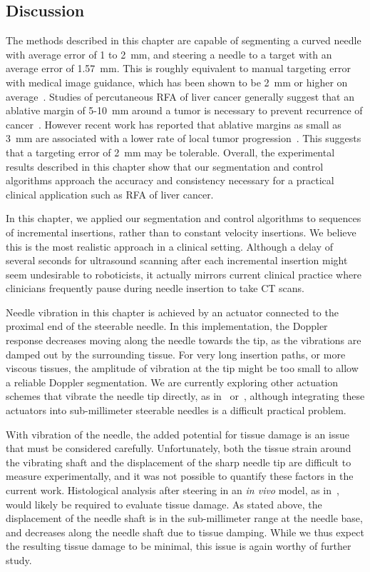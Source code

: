 \subsection{Discussion}
The methods described in this chapter are capable of segmenting a curved needle with average error of 1 to 2~mm, and steering a needle to a target with an average error of 1.57~mm. This is roughly equivalent to manual targeting error with medical image guidance, which has been shown to be 2~mm or higher on average~\cite{Crocetti2008,MaierHein2008,Schubert2013}. Studies of percutaneous RFA of liver cancer generally suggest that an ablative margin of 5-10~mm around a tumor is necessary to prevent recurrence of cancer~\cite{Gervais2009,Kim2006,Dodd2001}. However recent work has reported that ablative margins as small as 3~mm are associated with a lower rate of local tumor progression~\cite{Kim2010}. This suggests that a targeting error of 2~mm may be tolerable. Overall, the experimental results described in this chapter show that our segmentation and control algorithms approach the accuracy and consistency necessary for a practical clinical application such as RFA of liver cancer. 

In this chapter, we applied our segmentation and control algorithms to sequences of incremental insertions, rather than to constant velocity insertions. We believe this is the most realistic approach in a clinical setting. Although a delay of several seconds for ultrasound scanning after each incremental insertion might seem undesirable to roboticists, it actually mirrors current clinical practice where clinicians frequently pause during needle insertion to take CT scans. 

Needle vibration in this chapter is achieved by an actuator connected to the proximal end of the steerable needle. In this implementation, the Doppler response decreases moving along the needle towards the tip, as the vibrations are damped out by the surrounding tissue. For very long insertion paths, or more viscous tissues, the amplitude of vibration at the tip might be too small to allow a reliable Doppler segmentation. We are currently exploring other actuation schemes that vibrate the needle tip directly, as in~\cite{Harmat2006} or~\cite{McAleavey2003}, although integrating these actuators into sub-millimeter steerable needles is a difficult practical problem.

With vibration of the needle, the added potential for tissue damage is an issue that must be considered carefully. Unfortunately, both the tissue strain around the vibrating shaft and the displacement of the sharp needle tip are difficult to measure experimentally, and it was not possible to quantify these factors in the current work. Histological analysis after steering in an \textit{in vivo} model, as in~\cite{Majewicz2012}, would likely be required to evaluate tissue damage. As stated above, the displacement of the needle shaft is in the sub-millimeter range at the needle base, and decreases along the needle shaft due to tissue damping. While we thus expect the resulting tissue damage to be minimal, this issue is again worthy of further study.

